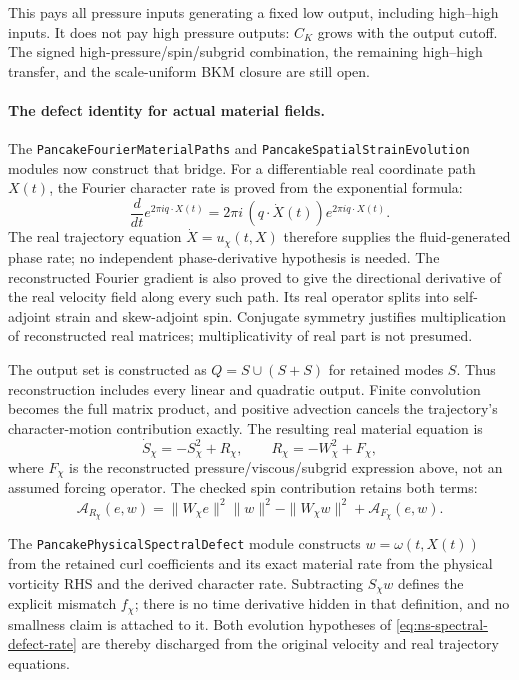 \documentclass[11pt]{article}
\theoremstyle{definition}
\begin{document}
This pays all pressure inputs generating a fixed low output, including
high--high inputs. It does not pay high pressure outputs: $C_K$ grows
with the output cutoff. The signed high-pressure/spin/subgrid combination,
the remaining high--high transfer, and the scale-uniform BKM closure
are still open.

\paragraph{The defect identity for actual material fields.}
The \texttt{PancakeFourierMaterialPaths} and
\texttt{PancakeSpatialStrainEvolution} modules now construct that bridge.
For a differentiable real coordinate path $X(t)$, the Fourier character
rate is proved from the exponential formula:
\[
 \frac{d}{dt}e^{2\pi i q\cdot X(t)}
 =2\pi i\,(q\cdot\dot X(t))e^{2\pi i q\cdot X(t)}.
\]
The real trajectory equation $\dot X=u_\chi(t,X)$ therefore supplies the
fluid-generated phase rate; no independent phase-derivative hypothesis
is needed. The reconstructed Fourier gradient is also proved to give
the directional derivative of the real velocity field along every such
path. Its real operator splits into self-adjoint strain and skew-adjoint
spin. Conjugate symmetry justifies multiplication of reconstructed real
matrices; multiplicativity of real part is not presumed.

The output set is constructed as $Q=S\cup(S+S)$ for retained modes $S$.
Thus reconstruction includes every linear and quadratic output.
Finite convolution becomes the full matrix product, and positive
advection cancels the trajectory's character-motion contribution exactly.
The resulting real material equation is
\[
 \dot S_\chi=-S_\chi^2+R_\chi,\qquad
 R_\chi=-W_\chi^2+F_\chi,
\]
where $F_\chi$ is the reconstructed pressure/viscous/subgrid expression
above, not an assumed forcing operator. The checked spin contribution
retains both terms:
\[
 \mathcal A_{R_\chi}(e,w)
 =\|W_\chi e\|^2\|w\|^2-\|W_\chi w\|^2
   +\mathcal A_{F_\chi}(e,w).
\]

The \texttt{PancakePhysicalSpectralDefect} module constructs
$w=\omega(t,X(t))$ from the retained curl coefficients and its exact
material rate from the physical vorticity RHS and the derived character
rate. Subtracting $S_\chi w$ defines the explicit mismatch $f_\chi$;
there is no time derivative hidden in that definition, and no smallness
claim is attached to it. Both evolution hypotheses of
\eqref{eq:ns-spectral-defect-rate} are thereby discharged from the
original velocity and real trajectory equations.
\end{document}
